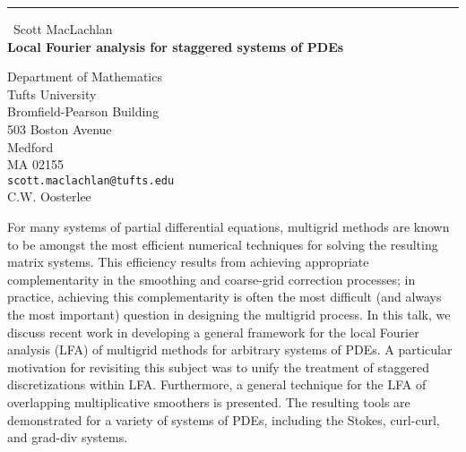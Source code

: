 \documentclass{report}
\begin{document}
\begin{center}
\rule{6in}{1pt} \
{\large Scott MacLachlan \\
{\bf Local Fourier analysis for staggered systems of PDEs}}

Department of Mathematics \\ Tufts University \\ Bromfield-Pearson Building \\ 503 Boston Avenue \\ Medford \\ MA 02155
\\
{\tt scott.maclachlan@tufts.edu}\\
C.W. Oosterlee\end{center}

For many systems of partial differential equations, multigrid methods
are known to be amongst the most efficient numerical techniques for
solving the resulting matrix systems. This efficiency results from
achieving appropriate complementarity in the smoothing and coarse-grid
correction processes; in practice, achieving this complementarity is
often the most difficult (and always the most important) question
in designing the multigrid process. In this talk, we discuss recent
work in developing a general framework for the local Fourier analysis
(LFA) of multigrid methods for arbitrary systems of PDEs. A
particular motivation for revisiting this subject was to unify the
treatment of staggered discretizations within LFA. Furthermore, a
general technique for the LFA of overlapping multiplicative smoothers is
presented. The resulting tools are demonstrated for a variety of
systems of PDEs, including the Stokes, curl-curl, and grad-div
systems.
\end{document}
